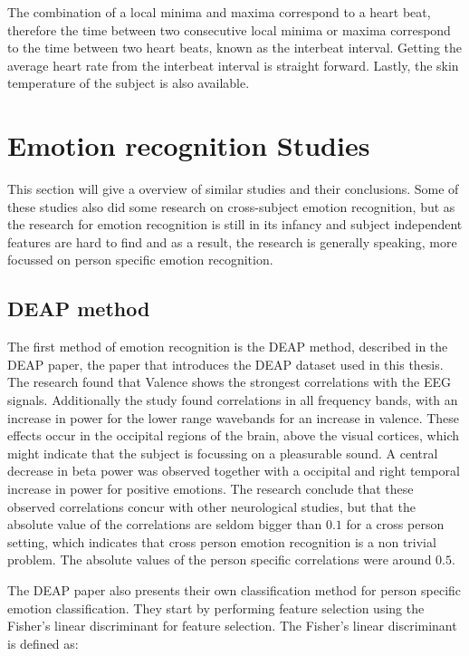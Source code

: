 \npar

The combination of a local minima and maxima correspond to a heart beat, therefore the time between two consecutive local minima or maxima correspond to the time between two heart beats, known as the interbeat interval. Getting the average heart rate from the interbeat interval is straight forward. Lastly, the skin temperature of the subject is also available.

\section{Emotion recognition Studies}
This section will give a overview of similar studies and their conclusions. Some of these studies also did some research on cross-subject emotion recognition, but as the research for emotion recognition is still in its infancy\citep{emorecoghard} and subject independent features are hard to find \citep{DEAP} and as a result, the research is generally speaking, more focussed on person specific emotion recognition.

\subsection{DEAP method}
The first method of emotion recognition is the DEAP method, described in the DEAP paper\citep{DEAP}, the paper that introduces the DEAP dataset used in this thesis. The research found that Valence shows the strongest correlations with the EEG signals. Additionally the study found correlations in all frequency bands, with an increase in power for the lower range wavebands for an increase in valence. These effects occur in the occipital regions of the brain, above the visual cortices, which might indicate that the subject is focussing on a pleasurable sound. A central decrease in beta power was observed together with a occipital and right temporal increase in power for positive emotions. The research conclude that these observed correlations concur with other neurological studies, but that the absolute value of the correlations are seldom bigger than $0.1$ for a cross person setting, which indicates that cross person emotion recognition is a non trivial problem. The absolute values of the person specific correlations were around $0.5$.

\npar

The DEAP paper also presents their own classification method for person specific emotion classification. They start by performing feature selection using the Fisher's linear discriminant for feature selection. The Fisher's linear discriminant is defined as:

